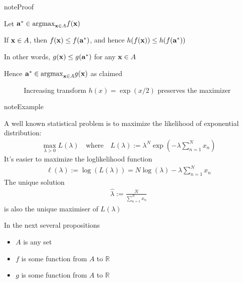 \documentclass[letterpaper,10pt,english]{jupyterBook}
\begin{document}
\begin{sphinxadmonition}{note}{Proof}

\sphinxAtStartPar
Let \({\bf a}^* \in \mathrm{argmax}_{{\bf x} \in A}f({\bf x})\)

\sphinxAtStartPar
If \({\bf x} \in A\), then \(f({\bf x}) \leq f({\bf a}^*)\), and hence \(h(f({\bf x})) \leq h(f({\bf a}^*)) \quad\)

\sphinxAtStartPar
In other words, \(g({\bf x}) \leq g({\bf a}^*)\) for any \({\bf x} \in A\)

\sphinxAtStartPar
Hence \({\bf a}^* \in \mathrm{argmax}_{{\bf x} \in A} g({\bf x})\) as claimed
\end{sphinxadmonition}

\begin{figure}[htbp]
\centering
\capstart

\noindent{}
\caption{Increasing transform \(h(x) = \exp(x/2)\) preserves the maximizer}\label{\detokenize{06.optimization_fundamentals:id6}}\end{figure}

\begin{sphinxadmonition}{note}{Example}

\sphinxAtStartPar
A well known statistical problem is to maximize the likelihood of exponential distribution:
\begin{equation*}
\begin{split}
%
\max_{\lambda > 0} L(\lambda)
\quad \text{where} \quad
L(\lambda) 
:= \lambda^N \exp \left(-\lambda \sum_{n=1}^N x_n \right)
%
\end{split}
\end{equation*}
\sphinxAtStartPar
It’s easier to maximize the log\sphinxhyphen{}likelihood function
\begin{equation*}
\begin{split}
%
\ell(\lambda) 
:= \log(L(\lambda))
= N \log(\lambda) - \lambda \sum_{n=1}^N x_n 
%
\end{split}
\end{equation*}
\sphinxAtStartPar
The unique solution
\begin{equation*}
\begin{split}
%
\hat \lambda := \frac{N}{\sum_{n=1}^N x_n}
%
\end{split}
\end{equation*}
\sphinxAtStartPar
is also the unique maximiser of \(L(\lambda)\)
\end{sphinxadmonition}

\sphinxAtStartPar
In the next several propositions
\begin{itemize}
\item {} 
\sphinxAtStartPar
\(A\) is any set

\item {} 
\sphinxAtStartPar
\(f\) is some function from \(A\) to \(\mathbb{R}\)

\item {} 
\sphinxAtStartPar
\(g\) is some function from \(A\) to \(\mathbb{R}\)

\end{itemize}
\end{document}
